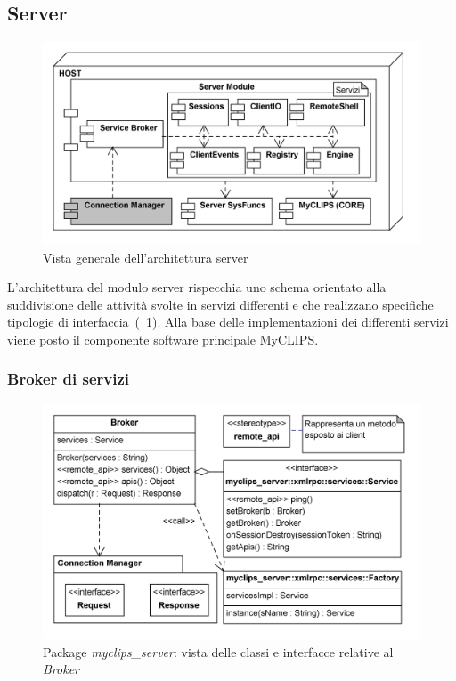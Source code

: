 \subsection{Server}

\begin{figure}[h]
\centering
\includegraphics[width=1\textwidth]{Immagini/Capitolo3/Deployment/Server.png}
\caption{Vista generale dell'architettura server}\label{fig:architettura-server}
\end{figure}

L'architettura del modulo server rispecchia uno schema orientato alla suddivisione delle attività svolte in servizi differenti e che realizzano specifiche tipologie di interfaccia~(\figurename~\ref{fig:architettura-server}). Alla base delle implementazioni dei differenti servizi viene posto il componente software principale MyCLIPS.

\subsubsection{Broker di servizi}

\begin{figure}
\centering
\includegraphics[width=1\textwidth]{Immagini/Capitolo3/Classi/myclips_server_Broker.png}
\caption{Package \emph{myclips\_server}: vista delle classi e interfacce relative al \emph{Broker}}\label{fig:class-myclips-server-broker}
\end{figure}

